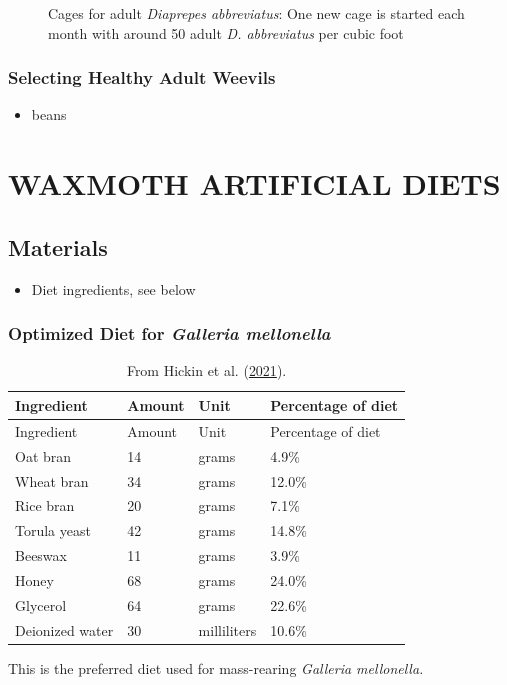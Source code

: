 \documentclass{sop_class}[overrideChapters] %
\providecommand{\tightlist}{%
  \setlength{\itemsep}{0pt}\setlength{\parskip}{0pt}}
\begin{document}
{\begin{figure}
{}

\caption[Cages for adult \textit{Diaprepes abbreviatus}]{Cages for adult \textit{Diaprepes abbreviatus}: One new cage is started each month with around 50 adult \textit{D. abbreviatus} per cubic foot}\label{fig:adult-cage}
\end{figure}
\hypertarget{selecting-weevils}{%
\subsection{Selecting Healthy Adult Weevils}\label{selecting-weevils}}
\begin{itemize}
\tightlist
\item
  beans
\end{itemize}
\hypertarget{art-diet-prep}{%
\chapter{WAXMOTH ARTIFICIAL DIETS}\label{art-diet-prep}}

\hypertarget{materials-1}{%
\section{Materials}\label{materials-1}}
\begin{itemize}
\tightlist
\item
  Diet ingredients, see below
\end{itemize}
\hypertarget{optimized-diet}{%
\subsection{\texorpdfstring{Optimized Diet for \emph{Galleria mellonella}}{Optimized Diet for Galleria mellonella}}\label{optimized-diet}}
\begin{longtable}[]{@{}llll@{}}
\caption{From Hickin et al. (\protect\hyperlink{ref-Hickin2021}{2021}).}\tabularnewline
\toprule()
Ingredient & Amount & Unit & Percentage of diet \\
\midrule()
\endfirsthead
\toprule()
Ingredient & Amount & Unit & Percentage of diet \\
\midrule()
\endhead
Oat bran & 14 & grams & 4.9\% \\
Wheat bran & 34 & grams & 12.0\% \\
Rice bran & 20 & grams & 7.1\% \\
Torula yeast & 42 & grams & 14.8\% \\
Beeswax & 11 & grams & 3.9\% \\
Honey & 68 & grams & 24.0\% \\
Glycerol & 64 & grams & 22.6\% \\
Deionized water & 30 & milliliters & 10.6\% \\
\bottomrule()
\end{longtable}
This is the preferred diet used for mass-rearing \emph{Galleria mellonella.}

}
\end{document}
